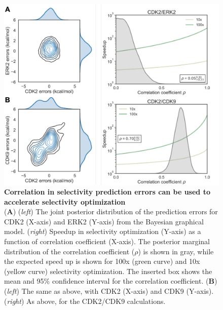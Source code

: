 \documentclass[9pt,lineno]{elife-modified} %
\begin{document}
\begin{figure}
\begin{fullwidth}
\begin{centering}
\includegraphics[width=1.0\linewidth]{figures/figure5.pdf}
\end{centering}
\caption{
\label{fig:figure-5}
{\bf Correlation in selectivity prediction errors can be used to accelerate selectivity optimization} \\
({\bf A}) (\emph{left}) The joint posterior distribution of the prediction errors for CDK2 (X-axis) and ERK2 (Y-axis) from the Bayesian graphical model. (\emph{right}) Speedup in selectivity optimization (Y-axis) as a function of correlation coefficient (X-axis). The posterior marginal distribution of the correlation coefficient ($\rho$) is shown in gray, while the expected speed up is shown for 100x (green curve) and 10x (yellow curve) selectivity optimization. The inserted box shows the mean and 95\% confidence interval for the correlation coefficient. 
({\bf B}) (\emph{left}) The same as above, with CDK2 (X-axis) and CDK9 (Y-axis). (\emph{right}) As above, for the CDK2/CDK9 calculations.}
\end{fullwidth}
\end{figure}


%
%
%
%
\end{document}
